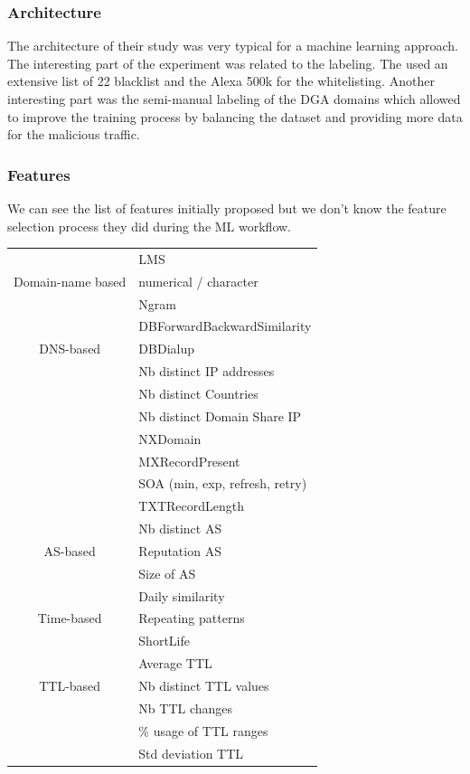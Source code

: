 \subsubsection{Architecture}
The architecture of their study was very typical for a machine learning approach. The interesting part of the experiment was related to the labeling. The used an extensive list of 22 blacklist and the Alexa 500k for the whitelisting. Another interesting part was the semi-manual labeling of the DGA domains which allowed to improve the training process by balancing the dataset and providing more data for the malicious traffic.

\subsubsection{Features}
We can see the list of features initially proposed but we don't know the feature selection process they did during the ML workflow.\\

\begin{tabular}{c|l}
\hline
 & LMS\\
Domain-name based & numerical / character\\
& Ngram\\
\hline
 & DBForwardBackwardSimilarity\\
DNS-based & DBDialup\\
& Nb distinct IP addresses\\
& Nb distinct Countries\\
& Nb distinct Domain Share IP\\
& NXDomain\\
& MXRecordPresent\\
& SOA (min, exp, refresh, retry)\\
& TXTRecordLength\\
\hline
 & Nb distinct AS\\
AS-based & Reputation AS\\
& Size of AS\\
\hline
 & Daily similarity\\
Time-based & Repeating patterns\\
& ShortLife\\
\hline
 & Average TTL\\
TTL-based & Nb distinct TTL values\\
& Nb TTL changes\\
& \% usage of TTL ranges\\
& Std deviation TTL\\
\end{tabular}

